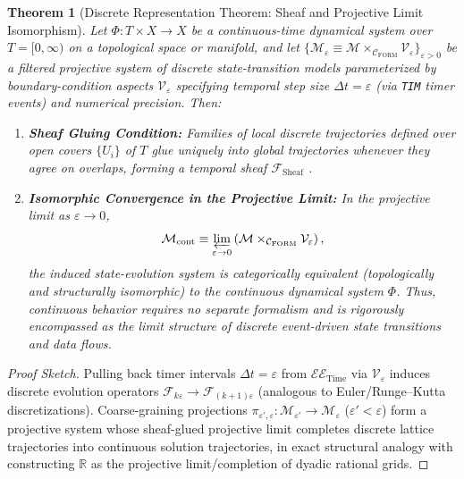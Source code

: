 \documentclass[11pt,a4paper]{article}
\theoremstyle{definition}
\theoremstyle{plain}
\newtheorem{theorem}{Theorem}[section]
\theoremstyle{remark}
\newcommand{\Cform}{\mathcal{C}_{\mathrm{FORM}}}
\begin{document}
\begin{theorem}[Discrete Representation Theorem: Sheaf and Projective Limit Isomorphism]\label{thm:continuous}
Let $\Phi : T \times X \to X$ be a continuous-time dynamical system over $T = [0, \infty)$ on a topological space or manifold, and let $\{\mathcal{M}_{\varepsilon} \equiv \mathcal{M} \times_{\Cform} \mathcal{V}_{\varepsilon}\}_{\varepsilon > 0}$ be a filtered projective system of discrete state-transition models parameterized by boundary-condition aspects $\mathcal{V}_{\varepsilon}$ specifying temporal step size $\Delta t = \varepsilon$ (via \texttt{TIM} timer events) and numerical precision. Then:
\begin{enumerate}
    \item \textbf{Sheaf Gluing Condition:} Families of local discrete trajectories defined over open covers $\{U_i\}$ of $T$ glue uniquely into global trajectories whenever they agree on overlaps, forming a temporal sheaf $\mathcal{F}_{\mathrm{Sheaf}}$ \cite{maclane1992}.
    \item \textbf{Isomorphic Convergence in the Projective Limit:} In the projective limit as $\varepsilon \to 0$,
    \begin{equation}
    \mathcal{M}_{\mathrm{cont}} \equiv \varprojlim_{\varepsilon \to 0} \left(\mathcal{M} \times_{\Cform} \mathcal{V}_{\varepsilon}\right),
    \end{equation}
    the induced state-evolution system is categorically equivalent (topologically and structurally isomorphic) to the continuous dynamical system $\Phi$. Thus, continuous behavior requires no separate formalism and is rigorously encompassed as the limit structure of discrete event-driven state transitions and data flows.
\end{enumerate}
\end{theorem}

\begin{proof}[Proof Sketch]
Pulling back timer intervals $\Delta t = \varepsilon$ from $\mathcal{EE}_{\mathrm{Time}}$ via $\mathcal{V}_{\varepsilon}$ induces discrete evolution operators $\mathcal{F}_{k\varepsilon} \to \mathcal{F}_{(k+1)\varepsilon}$ (analogous to Euler/Runge--Kutta discretizations). Coarse-graining projections $\pi_{\varepsilon', \varepsilon} : \mathcal{M}_{\varepsilon'} \to \mathcal{M}_{\varepsilon}$ ($\varepsilon' < \varepsilon$) form a projective system whose sheaf-glued projective limit completes discrete lattice trajectories into continuous solution trajectories, in exact structural analogy with constructing $\mathbb{R}$ as the projective limit/completion of dyadic rational grids.
\end{proof}
\end{document}
